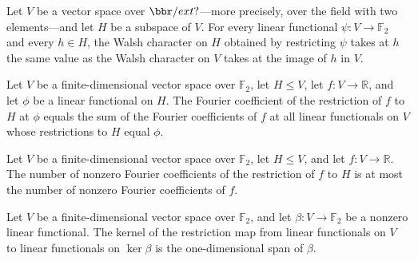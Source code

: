 \begin{theorem}
\label{FABL.dualWalshCharacter_dualRestrict}
\leanok
{}
Let $V$ be a vector space over $\bbr/	ext{?}$—more precisely, over the field with two
elements—and let $H$ be a subspace of $V$. For every linear functional
$\psi:V\to\mathbb{F}_2$ and every $h\in H$, the Walsh character on $H$ obtained by
restricting $\psi$ takes at $h$ the same value as the Walsh character on $V$ takes at
the image of $h$ in $V$.
\end{theorem}

\begin{theorem}
\label{FABL.dualFourierCoeff_subspaceRestriction_eq_sum_fiber}
\leanok
{}
Let $V$ be a finite-dimensional vector space over $\mathbb{F}_2$, let $H\le V$, let
$f:V\to\mathbb{R}$, and let $\phi$ be a linear functional on $H$. The Fourier
coefficient of the restriction of $f$ to $H$ at $\phi$ equals the sum of the Fourier
coefficients of $f$ at all linear functionals on $V$ whose restrictions to $H$ equal
$\phi$.
\end{theorem}

\begin{theorem}
\label{FABL.dualSpectralSparsity_subspaceRestriction_le}
\leanok
{}
Let $V$ be a finite-dimensional vector space over $\mathbb{F}_2$, let $H\le V$, and let
$f:V\to\mathbb{R}$. The number of nonzero Fourier coefficients of the restriction of $f$
to $H$ is at most the number of nonzero Fourier coefficients of $f$.
\end{theorem}

\begin{theorem}
\label{FABL.ker_dualRestrict_ker_eq_span}
\leanok
{}
Let $V$ be a finite-dimensional vector space over $\mathbb F_2$, and let
$\beta:V\to\mathbb F_2$ be a nonzero linear functional. The kernel of the restriction
map from linear functionals on $V$ to linear functionals on $\ker\beta$ is the
one-dimensional span of $\beta$.
\end{theorem}

